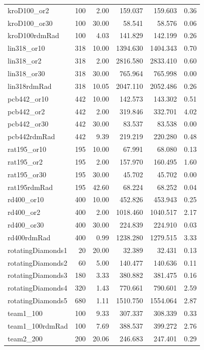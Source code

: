 \documentclass[11pt]{article}
\begin{document}
\begin{longtable}{lrrrrr}
kroD100\_or2 & 100 & 2.00 & 159.037 & 159.603 & 0.36 \\
kroD100\_or30 & 100 & 30.00 & 58.541 & 58.576 & 0.06 \\
kroD100rdmRad & 100 & 4.03 & 141.829 & 142.199 & 0.26 \\
lin318\_or10 & 318 & 10.00 & 1394.630 & 1404.343 & 0.70 \\
lin318\_or2 & 318 & 2.00 & 2816.580 & 2833.410 & 0.60 \\
lin318\_or30 & 318 & 30.00 & 765.964 & 765.998 & 0.00 \\
lin318rdmRad & 318 & 10.05 & 2047.110 & 2052.486 & 0.26 \\
pcb442\_or10 & 442 & 10.00 & 142.573 & 143.302 & 0.51 \\
pcb442\_or2 & 442 & 2.00 & 319.846 & 332.701 & 4.02 \\
pcb442\_or30 & 442 & 30.00 & 83.537 & 83.538 & 0.00 \\
pcb442rdmRad & 442 & 9.39 & 219.219 & 220.280 & 0.48 \\
rat195\_or10 & 195 & 10.00 & 67.991 & 68.080 & 0.13 \\
rat195\_or2 & 195 & 2.00 & 157.970 & 160.495 & 1.60 \\
rat195\_or30 & 195 & 30.00 & 45.702 & 45.702 & 0.00 \\
rat195rdmRad & 195 & 42.60 & 68.224 & 68.252 & 0.04 \\
rd400\_or10 & 400 & 10.00 & 452.826 & 453.943 & 0.25 \\
rd400\_or2 & 400 & 2.00 & 1018.460 & 1040.517 & 2.17 \\
rd400\_or30 & 400 & 30.00 & 224.839 & 224.910 & 0.03 \\
rd400rdmRad & 400 & 0.99 & 1238.280 & 1279.515 & 3.33 \\
rotatingDiamonds1 & 20 & 20.00 & 32.389 & 32.431 & 0.13 \\
rotatingDiamonds2 & 60 & 5.00 & 140.477 & 140.636 & 0.11 \\
rotatingDiamonds3 & 180 & 3.33 & 380.882 & 381.475 & 0.16 \\
rotatingDiamonds4 & 320 & 1.43 & 770.661 & 790.601 & 2.59 \\
rotatingDiamonds5 & 680 & 1.11 & 1510.750 & 1554.064 & 2.87 \\
team1\_100 & 100 & 9.33 & 307.337 & 308.339 & 0.33 \\
team1\_100rdmRad & 100 & 7.69 & 388.537 & 399.272 & 2.76 \\
team2\_200 & 200 & 20.06 & 246.683 & 247.401 & 0.29 \\

\end{longtable}
\end{document}
